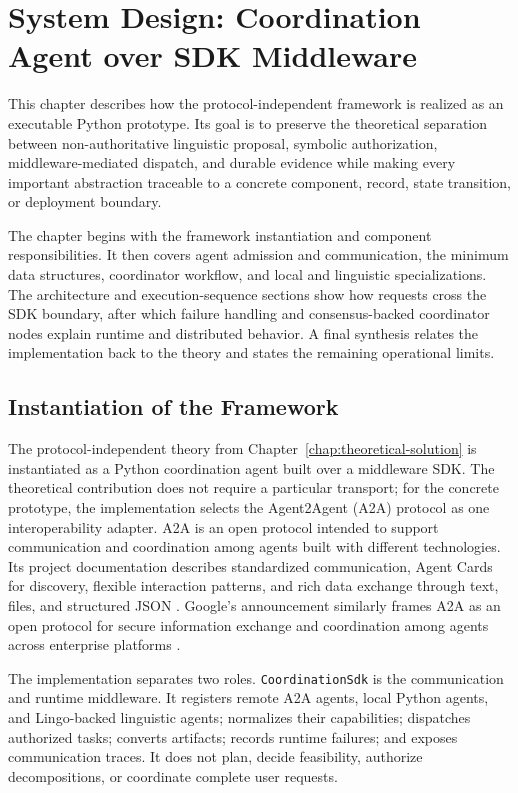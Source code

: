 \chapter{System Design: Coordination Agent over SDK Middleware}
\label{chap:implementation-design}

This chapter describes how the protocol-independent framework is realized as an executable Python prototype. Its goal is to preserve the theoretical separation between non-authoritative linguistic proposal, symbolic authorization, middleware-mediated dispatch, and durable evidence while making every important abstraction traceable to a concrete component, record, state transition, or deployment boundary.

The chapter begins with the framework instantiation and component responsibilities. It then covers agent admission and communication, the minimum data structures, coordinator workflow, and local and linguistic specializations. The architecture and execution-sequence sections show how requests cross the SDK boundary, after which failure handling and consensus-backed coordinator nodes explain runtime and distributed behavior. A final synthesis relates the implementation back to the theory and states the remaining operational limits.

\section{Instantiation of the Framework}

The protocol-independent theory from Chapter~\ref{chap:theoretical-solution} is instantiated as a Python coordination agent built over a middleware SDK. The theoretical contribution does not require a particular transport; for the concrete prototype, the implementation selects the Agent2Agent (A2A) protocol as one interoperability adapter. A2A is an open protocol intended to support communication and coordination among agents built with different technologies. Its project documentation describes standardized communication, Agent Cards for discovery, flexible interaction patterns, and rich data exchange through text, files, and structured JSON \cite{a2aproject2025}. Google's announcement similarly frames A2A as an open protocol for secure information exchange and coordination among agents across enterprise platforms \cite{google2025a2a}.

The implementation separates two roles. \texttt{CoordinationSdk} is the communication and runtime middleware. It registers remote A2A agents, local Python agents, and Lingo-backed linguistic agents; normalizes their capabilities; dispatches authorized tasks; converts artifacts; records runtime failures; and exposes communication traces. It does not plan, decide feasibility, authorize decompositions, or coordinate complete user requests.

